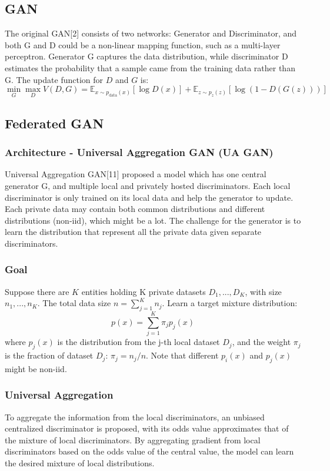 \documentclass{article}
\begin{document}
\subsection{GAN}
The original GAN[2] consists of two networks: Generator and Discriminator, and both G and D could be a non-linear mapping function, such as a multi-layer perceptron. Generator G captures the data distribution, while discriminator D estimates the probability that a sample came from the training data rather than G.
The update function for $D$ and $G$ is:
\[
\min_{G} \max_{D} V(D,G) = \mathbb{E}_{x \sim p_{\text{data}}(x)} [\log D(x)] + \mathbb{E}_{z \sim p_{z}(z)} [\log (1-D(G(z)))]
\]


\subsection{Federated GAN}

\subsubsection{Architecture - Universal Aggregation GAN (UA GAN)}
Universal Aggregation GAN[11] proposed a model which has one central generator G, and multiple local and privately hosted discriminators. Each local discriminator is only trained on its local data and help the generator to update. Each private data may contain both common distributions and different distributions (non-iid), which might be a lot. The challenge for the generator is to learn the distribution that represent all the private data given separate discriminators.

\subsubsection{Goal}
Suppose there are $K$ entities holding K private datasets $D_1, ..., D_K$, with size $n_1, ..., n_K$. The total data size $n = \sum_{j=1}^{K} n_j$.
Learn a target mixture distribution:
\[
p(x) = \sum_{j=1}^{K} \pi_j p_j(x) 
\]
where $p_j(x)$ is the distribution from the j-th local dataset $D_j$, and the weight $\pi_j$ is the fraction of dataset $D_j$: $\pi_j = n_j / n$. Note that different $p_i(x)$ and $p_j(x)$ might be non-iid.

\subsubsection{Universal Aggregation}
To aggregate the information from the local discriminators, an unbiased centralized discriminator is proposed, with its odds value approximates that of the mixture of local discriminators. By aggregating gradient from local discriminators based on the odds value of the central value, the model can learn the desired mixture of local distributions.
\end{document}
